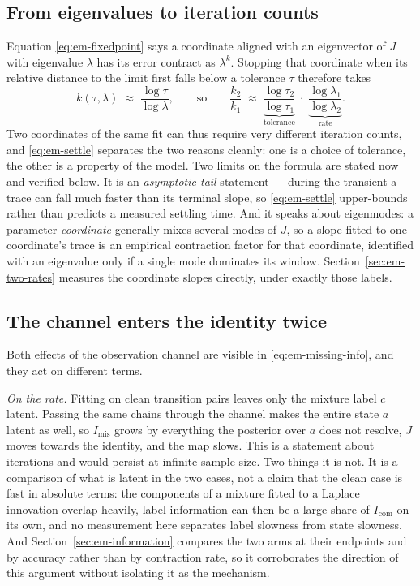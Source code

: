 \subsection{From eigenvalues to iteration counts}

Equation \eqref{eq:em-fixedpoint} says a coordinate aligned with an eigenvector
of $J$ with eigenvalue $\lambda$ has its error contract as $\lambda^k$. Stopping
that coordinate when its relative distance to the limit first falls below a
tolerance $\tau$ therefore takes
\begin{equation}
  k(\tau, \lambda) \;\approx\; \frac{\log \tau}{\log \lambda},
  \qquad\text{so}\qquad
  \frac{k_2}{k_1}
  \;\approx\;
  \underbrace{\frac{\log \tau_2}{\log \tau_1}}_{\text{tolerance}}
  \;\cdot\;
  \underbrace{\frac{\log \lambda_1}{\log \lambda_2}}_{\text{rate}} .
  \label{eq:em-settle}
\end{equation}
Two coordinates of the same fit can thus require very different iteration
counts, and \eqref{eq:em-settle} separates the two reasons cleanly: one is a
choice of tolerance, the other is a property of the model. Two limits on the
formula are stated now and verified below. It is an \emph{asymptotic tail}
statement --- during the transient a trace can fall much faster than its
terminal slope, so \eqref{eq:em-settle} upper-bounds rather than predicts a
measured settling time. And it speaks about eigenmodes: a parameter
\emph{coordinate} generally mixes several modes of $J$, so a slope fitted to
one coordinate's trace is an empirical contraction factor for that
coordinate, identified with an eigenvalue only if a single mode dominates its
window. Section~\ref{sec:em-two-rates} measures the coordinate slopes
directly, under exactly those labels.

\subsection{The channel enters the identity twice}
\label{sec:em-two-effects}

Both effects of the observation channel are visible in
\eqref{eq:em-missing-info}, and they act on different terms.

\emph{On the rate.} Fitting on clean transition pairs leaves only the mixture
label $c$ latent. Passing the same chains through the channel makes the entire
state $a$ latent as well, so $I_{\mathrm{mis}}$ grows by everything the
posterior over $a$ does not resolve, $J$ moves towards the identity, and the
map slows. This is a statement about iterations and would persist at infinite
sample size. Two things it is not. It is a comparison of what is latent in the
two cases, not a claim that the clean case is fast in absolute terms: the
components of a mixture fitted to a Laplace innovation overlap heavily, label
information can then be a large share of $I_{\mathrm{com}}$ on its own, and no
measurement here separates label slowness from state slowness. And
Section~\ref{sec:em-information} compares the two arms at their endpoints and
by accuracy rather than by contraction rate, so it corroborates the direction
of this argument without isolating it as the mechanism.

